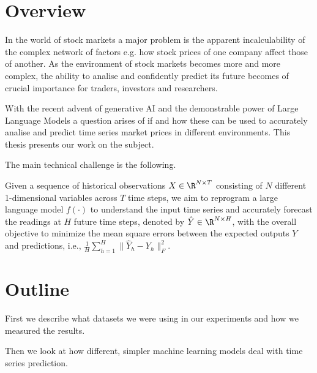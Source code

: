 \section{Overview}
In the world of stock markets a major problem is the apparent incalculability of the complex network of factors e.g. how stock prices of one company affect those of another. As the environment of stock markets becomes more and more complex, the ability to analise and confidently predict its future becomes of crucial importance for traders, investors and researchers.

With the recent advent of generative AI and the demonstrable power of Large Language Models a question arises of if and how these can be used to accurately analise and predict time series market prices in different environments. This thesis presents our work on the subject.

The main technical challenge is the following.

Given a sequence of historical observations \(X \in \R^{N\times T}\)
consisting of \(N\) different 1-dimensional variables across \(T\) time steps, we aim to reprogram a large
language model \(f(\cdot)\) to understand the input time series and accurately forecast the readings at \(H\) future time steps, denoted by \(\hat{Y} \in \R^{N\times H}\), with the overall objective to minimize the mean square errors between the expected outputs \(Y\) and predictions, i.e., \(\frac1H \sum_{h=1}^H \| \hat{Y}_h - Y_h \|_F^2 \). \cite{reprogramming_llm}

\section{Outline} %
First we describe what datasets we were using in our experiments and how we measured the results.

Then we look at how different, simpler machine learning models deal with time series prediction.



